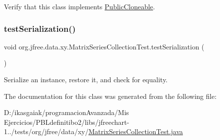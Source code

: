 Verify that this class implements \mbox{\hyperlink{}{Public\+Cloneable}}. \mbox{\label{classorg_1_1jfree_1_1data_1_1xy_1_1_matrix_series_collection_test_a814e6e847977f6091048ce61a0a92b73}} 
\subsubsection{\texorpdfstring{test\+Serialization()}{testSerialization()}}
{\footnotesize\ttfamily void org.\+jfree.\+data.\+xy.\+Matrix\+Series\+Collection\+Test.\+test\+Serialization (\begin{DoxyParamCaption}{ }\end{DoxyParamCaption})}

Serialize an instance, restore it, and check for equality. 

The documentation for this class was generated from the following file\+:\begin{DoxyCompactItemize}
\item 
D\+:/ikasgaiak/programacion\+Avanzada/\+Mis Ejercicios/\+P\+B\+Ldefinitibo2/libs/jfreechart-\/1../tests/org/jfree/data/xy/\mbox{\hyperlink{_matrix_series_collection_test_8java}{Matrix\+Series\+Collection\+Test.\+java}}\end{DoxyCompactItemize}
